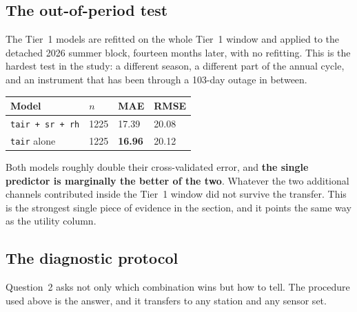 \documentclass[11pt,a4paper]{article}
\begin{document}
\subsection{The out-of-period test}

The Tier~1 models are refitted on the whole Tier~1 window and applied to the
detached 2026 summer block, fourteen months later, with no refitting. This is the
hardest test in the study: a different season, a different part of the annual
cycle, and an instrument that has been through a 103-day outage in between.

\begin{center}
\small
\begin{tabular}{lR{1.4cm}R{1.6cm}R{1.6cm}}
\toprule
\textbf{Model} & \textbf{$n$} & \textbf{MAE} & \textbf{RMSE} \\
\midrule
\texttt{tair + sr + rh} & 1225 & 17.39 & 20.08 \\
\texttt{tair} alone     & 1225 & \textbf{16.96} & 20.12 \\
\bottomrule
\end{tabular}
\end{center}

Both models roughly double their cross-validated error, and \textbf{the single
predictor is marginally the better of the two}. Whatever the two additional
channels contributed inside the Tier~1 window did not survive the transfer. This
is the strongest single piece of evidence in the section, and it points the same
way as the utility column.

\subsection{The diagnostic protocol}

Question~2 asks not only which combination wins but how to tell. The procedure
used above is the answer, and it transfers to any station and any sensor set.
\end{document}
